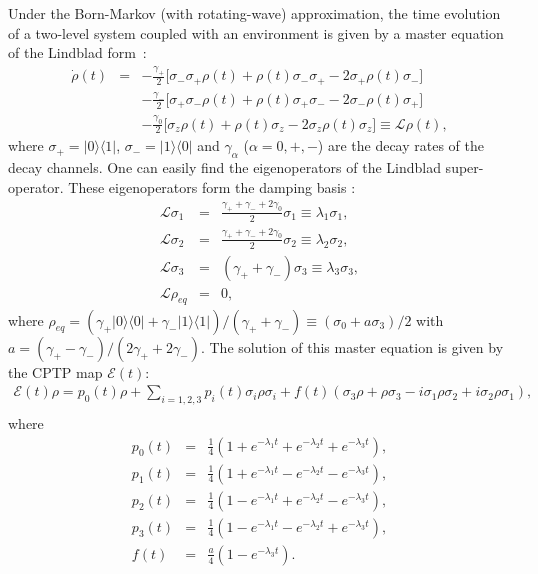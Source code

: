 Under the Born-Markov (with rotating-wave) approximation, the time evolution of a two-level system coupled with an environment is given by a master equation of the Lindblad form~\cite{Breuer}:
%
\begin{eqnarray}
\dot \rho  (t)
&=& -  \frac{\gamma _{+}}{2} \bigl[ \sigma _{-}\sigma _{+} \rho(t) + \rho (t) \sigma _{-} \sigma _{+} - 2 \sigma _{+} \rho (t) \sigma _{-} \bigr]
 \nonumber \\
 &&  -  \frac{\gamma _{-}}{2} \bigl[ \sigma _{+}\sigma _{-} \rho(t) + \rho (t) \sigma _{+} \sigma _{-} - 2 \sigma _{-} \rho (t) \sigma _{+} \bigr]
 \nonumber \\
 &&  -  \frac{\gamma _{0}}{2} \bigl[ \sigma _{z} \rho(t) + \rho (t) \sigma _{z} - 2 \sigma _{z} \rho (t) \sigma _{z} \bigr]
 \equiv \mathcal{L} \rho (t),
\end{eqnarray}
%
where $\sigma _{+} = |0\rangle \langle 1|$, $\sigma _{-} = |1\rangle \langle 0|$ and $\gamma _{\alpha}$ ($\alpha = 0, +,-$) are the decay rates of the decay channels.
One can easily find the eigenoperators of the Lindblad super-operator. 
These eigenoperators form the damping basis \cite{Briegel93}:
%
\begin{eqnarray}
\mathcal{L} \sigma _{1} &=& 
\frac{ \gamma _{+} + \gamma _{-} + 2 \gamma _{0}}{2} \sigma _{1}
\equiv \lambda _{1} \sigma _{1},
\\
\mathcal{L} \sigma _{2} &=& 
\frac{ \gamma _{+} + \gamma _{-} + 2 \gamma _{0}}{2} \sigma _{2}
\equiv \lambda _{2} \sigma _{2},
\\
\mathcal{L} \sigma _{3} &=& 
( \gamma _{+} + \gamma _{-} ) \sigma _{3}
\equiv \lambda _{3} \sigma _{3},
\\
\mathcal{L} \rho _{eq} &=& 0,
\end{eqnarray}
%
where $\rho _{eq} = (\gamma _{+} |0\rangle \langle 0| + \gamma _{-} |1\rangle \langle 1|)/ (\gamma _{+} +\gamma _{-}) \equiv (\sigma _{0} + a \sigma _{3})/2$
with $a= (\gamma_{+}-\gamma _{-})/(2\gamma _{+} +2\gamma _{-})$.
The solution of this master equation is given by the CPTP map $\mathcal{E} (t)$:
%
\begin{eqnarray}
\mathcal{E} (t) \rho = 
p_{0} (t) \rho  + \sum _{i=1,2,3}
p_{i} (t) \sigma _{i} \rho \sigma _{i}
+ f(t) ( \sigma _{3} \rho + \rho \sigma _{3} - i \sigma _{1} \rho \sigma _{2} + i \sigma _{2} \rho \sigma _{1}),
\nonumber \\
\label{eq:noisemap}
\end{eqnarray}
%
where
%
\begin{eqnarray}
p_{0}(t) &=& \frac{1}{4} ( 1+ e ^{-\lambda _{1} t} + e^{-\lambda _{2} t} + e^{-\lambda _{3} t}),
\\
p_{1}(t) &=& \frac{1}{4} ( 1+ e ^{-\lambda _{1} t} - e^{-\lambda _{2} t} - e^{-\lambda _{3} t}),
\\
p_{2}(t) &=& \frac{1}{4} ( 1- e ^{-\lambda _{1} t} + e^{-\lambda _{2} t} - e^{-\lambda _{3} t}),
\\
p_{3}(t) &=& \frac{1}{4} ( 1- e ^{-\lambda _{1} t} - e^{-\lambda _{2} t} + e^{-\lambda _{3} t}),
\\
f(t) &=& \frac{a}{4}(1- e^{- \lambda _{3} t}).
\end{eqnarray}
